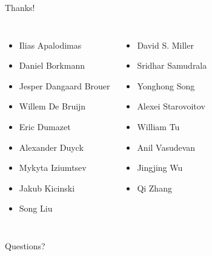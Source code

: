 \documentclass[aspectratio=169]{beamer}
\begin{document}
  \begin{frame}{Thanks!}
  \begin{columns}[T,onlytextwidth]
    \begin{itemize}
    \item Ilias Apalodimas
    \item Daniel Borkmann
    \item Jesper Dangaard Brouer
    \item Willem De Bruijn
    \item Eric Dumazet
    \item Alexander Duyck
    \item Mykyta Iziumtsev
    \item Jakub Kicinski
    \item Song Liu
    \end{itemize}
    
    \begin{itemize}
    \item David S. Miller
    \item Sridhar Samudrala
    \item Yonghong Song
    \item Alexei Starovoitov
    \item William Tu
    \item Anil Vasudevan
    \item Jingjing Wu
    \item Qi Zhang
    \end{itemize}
  \end{columns}
  \end{frame}

  \begin{frame}[standout]
    Questions?
  \end{frame}
\end{document}
